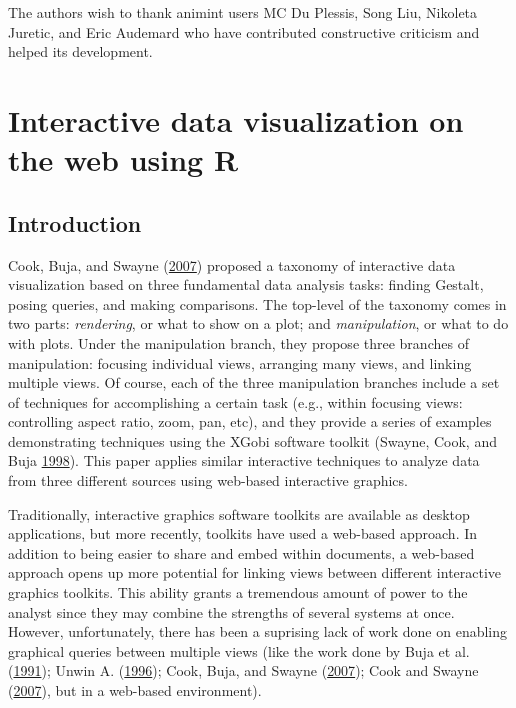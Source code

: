 \documentclass[12pt,]{isuthesis}
\begin{document}
The authors wish to thank animint users MC Du Plessis, Song Liu,
Nikoleta Juretic, and Eric Audemard who have contributed constructive
criticism and helped its development.

\chapter{Interactive data visualization on the web using R}

\section{Introduction}\label{introduction-1}

Cook, Buja, and Swayne (\protect\hyperlink{ref-Cook:2007uk}{2007})
proposed a taxonomy of interactive data visualization based on three
fundamental data analysis tasks: finding Gestalt, posing queries, and
making comparisons. The top-level of the taxonomy comes in two parts:
\emph{rendering}, or what to show on a plot; and \emph{manipulation}, or
what to do with plots. Under the manipulation branch, they propose three
branches of manipulation: focusing individual views, arranging many
views, and linking multiple views. Of course, each of the three
manipulation branches include a set of techniques for accomplishing a
certain task (e.g., within focusing views: controlling aspect ratio,
zoom, pan, etc), and they provide a series of examples demonstrating
techniques using the XGobi software toolkit (Swayne, Cook, and Buja
\protect\hyperlink{ref-xgobi}{1998}). This paper applies similar
interactive techniques to analyze data from three different sources
using web-based interactive graphics.

Traditionally, interactive graphics software toolkits are available as
desktop applications, but more recently, toolkits have used a web-based
approach. In addition to being easier to share and embed within
documents, a web-based approach opens up more potential for linking
views between different interactive graphics toolkits. This ability
grants a tremendous amount of power to the analyst since they may
combine the strengths of several systems at once. However,
unfortunately, there has been a suprising lack of work done on enabling
graphical queries between multiple views (like the work done by Buja et
al. (\protect\hyperlink{ref-Buja:1991vh}{1991}); Unwin A.
(\protect\hyperlink{ref-MANET}{1996}); Cook, Buja, and Swayne
(\protect\hyperlink{ref-Cook:2007uk}{2007}); Cook and Swayne
(\protect\hyperlink{ref-ggobi:2007}{2007}), but in a web-based
environment).
\end{document}
